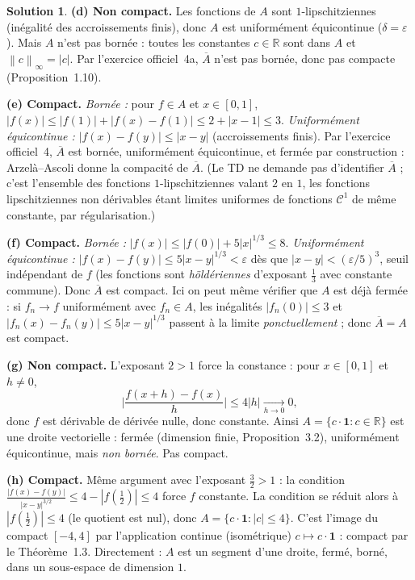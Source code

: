 \documentclass[11pt,a4paper]{article}
\newcommand{\R}{\mathbb{R}}
\newcommand{\adh}[1]{\overline{#1}}
\newcommand{\norm}[1]{\left\|#1\right\|}
\theoremstyle{definition}
\newtheorem*{solution}{Solution}
\begin{document}
\begin{solution}
\medskip
\noindent\textbf{(d) Non compact.} Les fonctions de $A$ sont $1$-lipschitziennes (inégalité des accroissements finis), donc $A$ est uniformément équicontinue ($\delta=\varepsilon$). Mais $A$ n'est pas bornée : toutes les constantes $c\in\R$ sont dans $A$ et $\norm{c}_\infty=|c|$. Par l'exercice officiel~4a, $\adh A$ n'est pas bornée, donc pas compacte (Proposition~1.10).

\medskip
\noindent\textbf{(e) Compact.} \emph{Bornée :} pour $f\in A$ et $x\in[0,1]$, $|f(x)|\le|f(1)|+|f(x)-f(1)|\le2+|x-1|\le3$. \emph{Uniformément équicontinue :} $|f(x)-f(y)|\le|x-y|$ (accroissements finis). Par l'exercice officiel~4, $\adh A$ est bornée, uniformément équicontinue, et fermée par construction : Arzelà--Ascoli donne la compacité de $\adh A$. (Le TD ne demande pas d'identifier $\adh A$ ; c'est l'ensemble des fonctions $1$-lipschitziennes valant $2$ en $1$, les fonctions lipschitziennes non dérivables étant limites uniformes de fonctions $\mathcal C^1$ de même constante, par régularisation.)

\medskip
\noindent\textbf{(f) Compact.} \emph{Bornée :} $|f(x)|\le|f(0)|+5|x|^{1/3}\le8$. \emph{Uniformément équicontinue :} $|f(x)-f(y)|\le5|x-y|^{1/3}<\varepsilon$ dès que $|x-y|<(\varepsilon/5)^3$, seuil indépendant de $f$ (les fonctions sont \emph{höldériennes} d'exposant $\frac13$ avec constante commune). Donc $\adh A$ est compact. Ici on peut même vérifier que $A$ est déjà fermée : si $f_n\to f$ uniformément avec $f_n\in A$, les inégalités $|f_n(0)|\le3$ et $|f_n(x)-f_n(y)|\le5|x-y|^{1/3}$ passent à la limite \emph{ponctuellement} ; donc $\adh A=A$ est compact.

\medskip
\noindent\textbf{(g) Non compact.} L'exposant $2>1$ force la constance : pour $x\in[0,1]$ et $h\ne0$,
\[
\Big|\frac{f(x+h)-f(x)}{h}\Big|\le4|h|\xrightarrow[h\to0]{}0 ,
\]
donc $f$ est dérivable de dérivée nulle, donc constante. Ainsi $A=\{c\cdot\mathbf 1 : c\in\R\}$ est une droite vectorielle : fermée (dimension finie, Proposition~3.2), uniformément équicontinue, mais \emph{non bornée}. Pas compact.

\medskip
\noindent\textbf{(h) Compact.} Même argument avec l'exposant $\frac32>1$ : la condition $\frac{|f(x)-f(y)|}{|x-y|^{3/2}}\le4-|f(\frac12)|\le4$ force $f$ constante. La condition se réduit alors à $|f(\frac12)|\le4$ (le quotient est nul), donc $A=\{c\cdot\mathbf 1 : |c|\le4\}$. C'est l'image du compact $[-4,4]$ par l'application continue (isométrique) $c\mapsto c\cdot\mathbf 1$ : compact par le Théorème~1.3. Directement : $A$ est un segment d'une droite, fermé, borné, dans un sous-espace de dimension $1$.
\end{solution}
\end{document}
